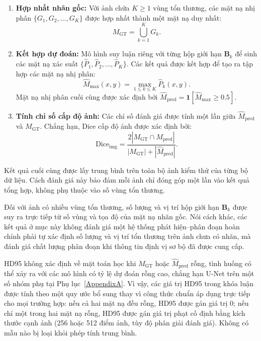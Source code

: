 \begin{enumerate}
    \item \textbf{Hợp nhất nhãn gốc:} Với ảnh chứa $K\geq1$ vùng tổn thương, các mặt nạ nhị phân $\{G_1,G_2,\ldots,G_K\}$ được hợp nhất thành một mặt nạ duy nhất:
    \begin{equation}
        M_{\mathrm{GT}}=\bigcup_{k=1}^{K}G_k.
        \label{eq:gt_union}
    \end{equation}

    \item \textbf{Kết hợp dự đoán:} Mô hình suy luận riêng với từng hộp giới hạn $\mathbf{B}_k$ để sinh các mặt nạ xác suất $\{\hat{P}_1,\hat{P}_2,\ldots,\hat{P}_K\}$. Các kết quả được kết hợp để tạo ra tập hợp các mặt nạ nhị phân:
    \begin{equation}
        \hat{M}_{\mathrm{max}}(x,y)
        =\max_{1\leq k\leq K}\hat{P}_k(x,y).
        \label{eq:pred_max_merge}
    \end{equation}
    Mặt nạ nhị phân cuối cùng được xác định bởi
    $\hat{M}_{\mathrm{pred}}
    =\mathbf{1}[\hat{M}_{\mathrm{max}}\geq0.5]$.

    \item \textbf{Tính chỉ số cấp độ ảnh:} Các chỉ số đánh giá được tính một lần giữa $\hat{M}_{\mathrm{pred}}$ và $M_{\mathrm{GT}}$. Chẳng hạn, Dice cấp độ ảnh được xác định bởi:
    \begin{equation}
        \mathrm{Dice}_{\mathrm{img}}
        =\frac{2|M_{\mathrm{GT}}\cap\hat{M}_{\mathrm{pred}}|}
        {|M_{\mathrm{GT}}|+|\hat{M}_{\mathrm{pred}}|}.
        \label{eq:dice_img}
    \end{equation}
\end{enumerate}

Kết quả cuối cùng được lấy trung bình trên toàn bộ ảnh kiểm thử của từng bộ dữ liệu. Cách đánh giá này bảo đảm mỗi ảnh chỉ đóng góp một lần vào kết quả tổng hợp, không phụ thuộc vào số vùng tổn thương.

Đối với ảnh có nhiều vùng tổn thương, số lượng và vị trí hộp giới hạn $\mathbf{B}_k$ được suy ra trực tiếp từ số vùng và tọa độ của mặt nạ nhãn gốc. Nói cách khác, các kết quả ở mục này không đánh giá một hệ thống phát hiện--phân đoạn hoàn chỉnh phải tự xác định số lượng và vị trí tổn thương trên ảnh chưa có nhãn, mà đánh giá chất lượng phân đoạn khi thông tin định vị sơ bộ đã được cung cấp.

HD95 không xác định về mặt toán học khi $M_{\mathrm{GT}}$ hoặc $\hat{M}_{\mathrm{pred}}$ rỗng, tình huống có thể xảy ra với các mô hình có tỷ lệ dự đoán rỗng cao, chẳng hạn U-Net trên một số nhóm phụ tại Phụ lục~\ref{AppendixA}. Vì vậy, các giá trị HD95 trong khóa luận được tính theo một quy ước bổ sung thay vì công thức chuẩn áp dụng trực tiếp cho mọi trường hợp: nếu cả hai mặt nạ đều rỗng, HD95 được gán giá trị 0; nếu chỉ một trong hai mặt nạ rỗng, HD95 được gán giá trị phạt cố định bằng kích thước cạnh ảnh (256 hoặc 512 điểm ảnh, tùy độ phân giải đánh giá). Không có mẫu nào bị loại khỏi phép tính trung bình.
